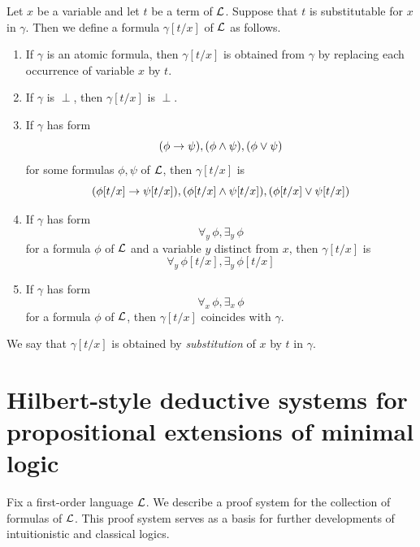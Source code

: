 \documentclass[10pt]{amsart}
\begin{document}
\begin{definition}
	Let $x$ be a variable and let $t$ be a term of ${\mathcal L}$. Suppose that $t$ is substitutable for $x$ in $\gamma$. Then we define a formula $\gamma[t/x]$ of ${\mathcal L}$ as follows.
	\begin{enumerate}[label=\textbf{(\arabic*)}, leftmargin=3.0em]
		\item If $\gamma$ is an atomic formula, then $\gamma[t/x]$ is obtained from $\gamma$ by replacing each occurrence of variable $x$ by $t$.
		\item If $\gamma$ is $\perp$, then $\gamma[t/x]$ is $\perp$.
		\item If $\gamma$ has form
		      $$(\phi \rightarrow \psi),(\phi \wedge \psi),(\phi \vee \psi)$$
		      for some formulas $\phi,\psi$ of ${\mathcal L}$, then $\gamma[t/x]$ is
		      $$(\phi[t/x] \rightarrow \psi[t/x]),(\phi[t/x] \wedge \psi[t/x]),(\phi[t/x] \vee \psi[t/x])$$
		\item If $\gamma$ has form
		      $$\forall_y\,\phi,\exists_y\,\phi$$
		      for a formula $\phi$ of ${\mathcal L}$ and a variable $y$ distinct from $x$, then $\gamma[t/x]$ is
		      $$\forall_y\,\phi[t/x],\exists_y\,\phi[t/x]$$
		\item If $\gamma$ has form
		      $$\forall_x\,\phi,\exists_x\,\phi$$
		      for a formula $\phi$ of ${\mathcal L}$, then $\gamma[t/x]$ coincides with $\gamma$.
	\end{enumerate}
	We say that $\gamma[t/x]$ is obtained by \textit{substitution} of $x$ by $t$ in $\gamma$.
\end{definition}

\section{Hilbert-style deductive systems for propositional extensions of minimal logic}
\noindent
Fix a first-order language ${\mathcal L}$. We describe a proof system for the collection of formulas of ${\mathcal L}$. This proof system serves as a basis for further developments of intuitionistic and classical logics. 
\end{document}
